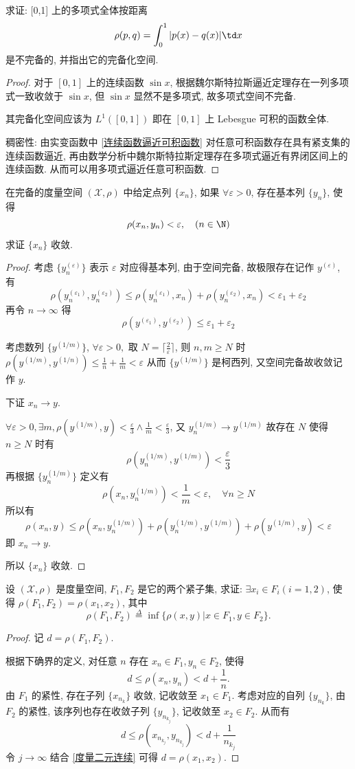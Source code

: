 \problem[1.2.4] 求证: [0,1] 上的多项式全体按距离 $$\rho(p,q)=\int_0^1 |p(x)-q(x)|\td x$$ 是不完备的, 并指出它的完备化空间.

\begin{proof}
	对于 $[0,1]$ 上的连续函数 $\sin x$, 根据魏尔斯特拉斯逼近定理存在一列多项式一致收敛于 $\sin x$, 但 $\sin x$ 显然不是多项式, 故多项式空间不完备.

	其完备化空间应该为 $L^1([0,1])$ 即在 $[0,1]$ 上 Lebesgue 可积的函数全体.

	稠密性: 由实变函数中 \ref{连续函数逼近可积函数} 对任意可积函数存在具有紧支集的连续函数逼近, 再由数学分析中魏尔斯特拉斯定理存在多项式逼近有界闭区间上的连续函数. 从而可以用多项式逼近任意可积函数.


\end{proof}

\problem[1.2.5] 在完备的度量空间 $(\mathscr X,\rho)$ 中给定点列 $\{x_n\}$, 如果 $\forall \varepsilon>0$, 存在基本列 $\{y_n\}$, 使得 $$\rho(x_n,y_n)<\varepsilon,\quad (n\in\N)$$ 求证 $\{x_n\}$ 收敛.

\begin{proof}
	考虑 $\{y_n^{(\varepsilon)}\}$ 表示 $\varepsilon$ 对应得基本列, 由于空间完备, 故极限存在记作 $y^{(\varepsilon)}$, 有 $$\rho(y_n^{(\varepsilon_1)},y_n^{(\varepsilon_2)})\leqslant\rho(y_n^{(\varepsilon_1)},x_n)+\rho(y_n^{(\varepsilon_2)},x_n)<\varepsilon_1+\varepsilon_2$$ 再令 $n\to\infty$ 得 $$\rho(y^{(\varepsilon_1)},y^{(\varepsilon_2)})\leqslant\varepsilon_1+\varepsilon_2$$

	考虑数列 $\{y^{(1/m)}\}$, $\forall \varepsilon>0,$ 取 $N=\lceil \frac 2 \varepsilon\rceil$, 则 $n,m\geqslant N$ 时 $\rho(y^{(1/m)},y^{(1/n)})\leqslant\frac 1 n+\frac 1 m< \varepsilon$ 从而 $\{y^{(1/m)}\}$ 是柯西列, 又空间完备故收敛记作 $y$.

	下证 $x_n\to y$.

	$\forall \varepsilon>0, \exists m, \rho(y^{(1/m)},y)<\frac \varepsilon 3\wedge \frac 1 m<\frac \varepsilon 3$, 又 $y_n^{(1/m)}\to y^{(1/m)}$ 故存在 $N$ 使得 $n\geqslant N$ 时有 $$\rho(y_n^{(1/m)},y^{(1/m)})<\frac \varepsilon 3$$ 再根据 $\{y_n^{(1/m)}\}$ 定义有 $$\rho(x_n,y_n^{(1/m)})<\frac 1 m<\varepsilon,\quad \forall n\geqslant N$$ 所以有 $$\rho(x_n,y)\leqslant\rho(x_n,y_n^{(1/m)})+\rho(y_n^{(1/m)},y^{(1/m)})+\rho(y^{(1/m)},y)<\varepsilon$$ 即 $x_n\to y$.

	所以 $\{x_n\}$ 收敛.
\end{proof}

\problem[1.3.4] 设 $(\mathscr X,\rho)$ 是度量空间, $F_1,F_2$ 是它的两个紧子集, 求证: $\exists x_i\in F_i(i=1,2)$, 使得 $\rho(F_1,F_2)=\rho(x_1,x_2)$, 其中 $$\rho(F_1,F_2)\overset{\Delta}{=}\inf\lbrace\rho(x,y)|x\in F_1,y\in F_2\rbrace.$$

\begin{proof}
	记 $d=\rho(F_1,F_2)$.

	根据下确界的定义, 对任意 $n$ 存在 $x_n\in F_1,y_n\in F_2$, 使得 $$d\leqslant \rho(x_n,y_n)<d+\frac 1 n.$$ 由 $F_1$ 的紧性, 存在子列 $\{x_{n_k}\}$ 收敛, 记收敛至 $x_1\in F_1$. 考虑对应的自列 $\{y_{n_k}\}$, 由 $F_2$ 的紧性, 该序列也存在收敛子列 $\{y_{n_{k_j}}\}$, 记收敛至 $x_2\in F_2$. 从而有 $$d\leqslant\rho(x_{n_{k_j}},y_{n_{k_j}})<d+\frac 1 {n_{k_j}}$$ 令 $j\to\infty$ 结合 \ref{度量二元连续} 可得 $d=\rho(x_1,x_2)$.
\end{proof}
